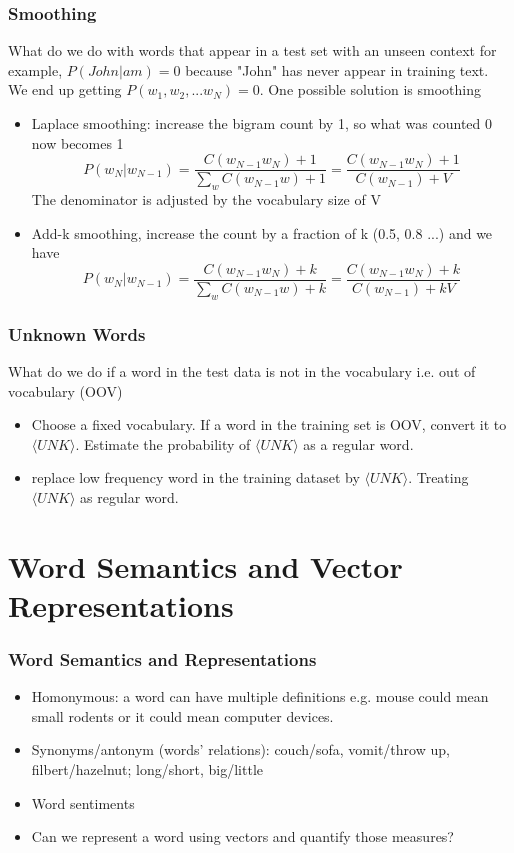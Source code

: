 \documentclass[notheorems, aspectratio=54]{beamer}
\begin{document}
\begin{frame}
\frametitle{Smoothing}
What do we do with words that appear in a test set with an unseen context for example, $P(John|am)=0$ because "John" has never appear in training text. We end up getting $P(w_1, w_2, ...w_N)=0$. One possible solution is smoothing
\begin{itemize}
\item Laplace smoothing: increase the bigram count by 1, so what was counted 0 now becomes 1
$$
P(w_N|w_{N-1})=\frac{C(w_{N-1}w_N)+1}{\sum_{w}C(w_{N-1}w)+1}=\frac{C(w_{N-1}w_N)+1}{C(w_{N-1})+V}
$$
The denominator is adjusted by the vocabulary size of V

\item Add-k smoothing, increase the count by a fraction of k (0.5, 0.8 ...) and we have 
$$
P(w_N|w_{N-1})=\frac{C(w_{N-1}w_N)+k}{\sum_{w}C(w_{N-1}w)+k}=\frac{C(w_{N-1}w_N)+k}{C(w_{N-1})+kV}
$$
\end{itemize}

\end{frame}
\begin{frame}
\frametitle{Unknown Words}
What do we do if a word in the test data is not in the vocabulary i.e. out of vocabulary (OOV)
\begin{itemize} 
\item Choose a fixed vocabulary. If a word in the training set is OOV, convert it to $\langle UNK\rangle$. Estimate the probability of $\langle UNK\rangle$ as a regular word.
\item replace low frequency word in the training dataset by $\langle UNK\rangle$. Treating $\langle UNK\rangle$ as regular word.
\end{itemize}

\end{frame}

\section{Word Semantics and Vector Representations}
\begin{frame}
\frametitle{Word Semantics and Representations}
\begin{itemize} 
\item Homonymous: a word can have multiple definitions e.g. mouse could mean small rodents or it could mean computer devices. 
\item Synonyms/antonym (words' relations): couch/sofa, vomit/throw up, filbert/hazelnut; long/short, big/little
\item Word sentiments
\item Can we represent a word using vectors and quantify those measures?
\end{itemize}

\end{frame}
\end{document}
